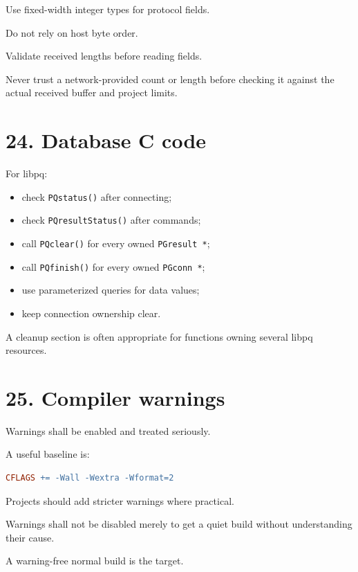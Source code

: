 \documentclass[11pt,a4paper]{article}
\begin{document}
Use fixed-width integer types for protocol fields.

Do not rely on host byte order.

Validate received lengths before reading fields.

Never trust a network-provided count or length before checking it
against the actual received buffer and project limits.

\section{24. Database C code}\label{24-database-c-code}

For libpq:

\begin{itemize}
\tightlist
\item
  check \passthrough{\lstinline!PQstatus()!} after connecting;
\item
  check \passthrough{\lstinline!PQresultStatus()!} after commands;
\item
  call \passthrough{\lstinline!PQclear()!} for every owned
  \passthrough{\lstinline!PGresult *!};
\item
  call \passthrough{\lstinline!PQfinish()!} for every owned
  \passthrough{\lstinline!PGconn *!};
\item
  use parameterized queries for data values;
\item
  keep connection ownership clear.
\end{itemize}

A cleanup section is often appropriate for functions owning several
libpq resources.

\section{25. Compiler warnings}\label{25-compiler-warnings}

Warnings shall be enabled and treated seriously.

A useful baseline is:

\begin{lstlisting}[language=make]
CFLAGS += -Wall -Wextra -Wformat=2
\end{lstlisting}

Projects should add stricter warnings where practical.

Warnings shall not be disabled merely to get a quiet build without
understanding their cause.

A warning-free normal build is the target.
\end{document}
